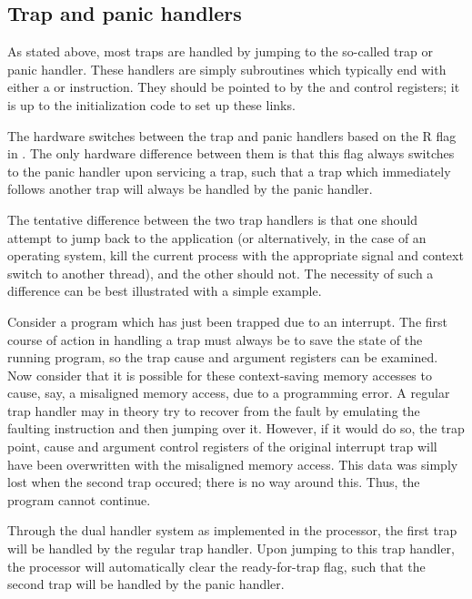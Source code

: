 \subsection{Trap and panic handlers}
\label{sec:core-ug-traps-handlers}

As stated above, most traps are handled by jumping to the so-called trap or
panic handler. These handlers are simply subroutines which typically end with
either a  or  instruction. They should be pointed to by
the  and  control registers; it is up to the initialization
code to set up these links.

The hardware switches between the trap and panic handlers based on the R flag
in . The only hardware difference between them is that this flag
always switches to the panic handler upon servicing a trap, such that a trap
which immediately follows another trap will always be handled by the panic
handler.

The tentative difference between the two trap handlers is that one should 
attempt to jump back to the application (or alternatively, in the case of an 
operating system, kill the current process with the appropriate signal and 
context switch to another thread), and the other should not. The necessity of 
such a difference can be best illustrated with a simple example.

Consider a program which has just been trapped due to an interrupt. The first 
course of action in handling a trap must always be to save the state of the 
running program, so the trap cause and argument registers can be examined. Now 
consider that it is possible for these context-saving memory accesses to cause, 
say, a misaligned memory access, due to a programming error. A regular trap 
handler may in theory try to recover from the fault by emulating the faulting 
instruction and then jumping over it. However, if it would do so, the trap 
point, cause and argument control registers of the original interrupt trap will 
have been overwritten with the misaligned memory access. This data was simply
lost when the second trap occured; there is no way around this. Thus, the
program cannot continue.

Through the dual handler system as implemented in the \rvex{} processor, the
first trap will be handled by the regular trap handler. Upon jumping to this
trap handler, the processor will automatically clear the ready-for-trap flag,
such that the second trap will be handled by the panic handler.

